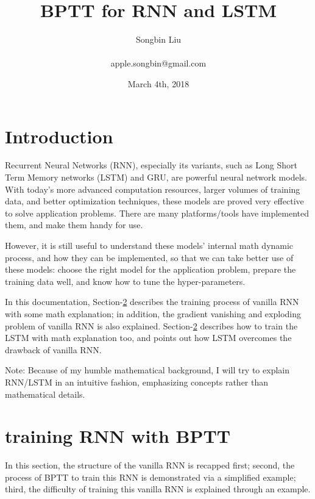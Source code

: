 \documentclass{article}
\begin{document}
\author{Songbin Liu \\\\ apple.songbin@gmail.com} %
\title{BPTT for RNN and LSTM} %
\date{March 4th, 2018} %
\maketitle{} %

\section{Introduction}
Recurrent Neural Networks (RNN), especially its variants, such as Long Short Term Memory networks (LSTM) and GRU,
are powerful neural network models. With today's more advanced computation resources, larger volumes of training data,
and better optimization techniques, these models are proved very effective to solve application problems.  There are many
platforms/tools have implemented them, and make them handy for use.

However, it is still useful to understand these models' internal math dynamic process, and how they can be implemented, so that
we can take better use of these models: choose the right model for the application problem, prepare the training data well, and know how to
tune the hyper-parameters.

In this documentation, Section-\ref{sec:rnn} describes the training process of vanilla RNN with some math explanation; 
in addition, the gradient vanishing and exploding problem of vanilla RNN is also explained.  Section-\ref{sec:rnn} describes how to
train the LSTM with math explanation too, and points out how LSTM overcomes the drawback of vanilla RNN.

Note: Because of my humble mathematical background, I will try to explain RNN/LSTM in an intuitive fashion, emphasizing concepts rather than mathematical details.


\section{training RNN with BPTT} \label{sec:rnn}
In this section, the structure of the vanilla RNN is recapped first; second, the process of BPTT to
train this RNN is demonstrated via a simplified example; third, the difficulty of training this vanilla RNN
is explained through an example.
\end{document}
